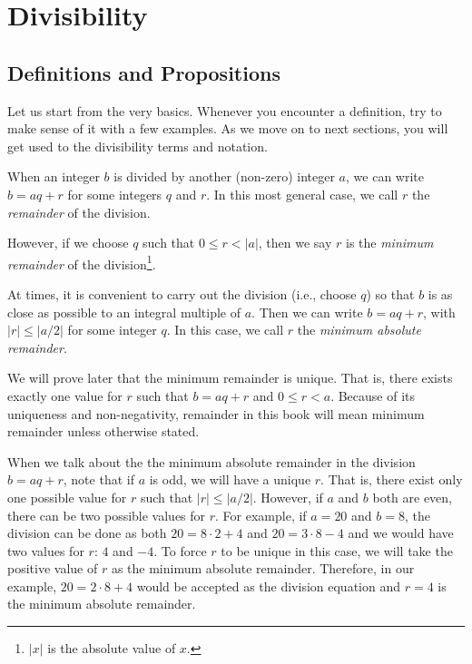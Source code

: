 \chapter{Divisibility}\label{ch:divisibility}

\section{Definitions and Propositions}
Let us start from the very basics. Whenever you encounter a definition, try to make sense of it with a few examples. As we move on to next sections, you will get used to the divisibility terms and notation.
\begin{definition}\label{def:remainder}
	When an integer $b$ is divided by another (non-zero) integer $a$, we can write $b=aq+r$ for some integers $q$ and $r$. In this most general case, we call $r$ the \textit{remainder} of the division.

	However, if we choose $q$ such that $0\leq r< |a|$, then we say $r$ is the \textit{minimum remainder} of the division\footnote{$|x|$ is the absolute value of $x$.}.

	At times, it is convenient to carry out the division (i.e., choose $q$) so that $b$ is as close as possible to an integral multiple of $a$. Then we can write $b = aq + r$, with $|r| \leq |a/2|$ for some integer $q$.  In this case, we call $r$ the \textit{minimum absolute remainder}.
\end{definition}

\begin{note}[1]
	We will prove later that the minimum remainder is unique. That is, there exists exactly one value for $r$ such that $b=aq+r$ and $0 \leq r <a$. Because of its uniqueness and non-negativity, remainder in this book will mean minimum remainder unless otherwise stated.
\end{note}

\begin{note}[2]
	When we talk about the the minimum absolute remainder in the division $b=aq+r$, note that if $a$ is odd, we will have a unique $r$. That is, there exist only one possible value for $r$ such that $|r| \leq \left|a/2\right|$. However, if $a$ and $b$ both are even, there can be two possible values for $r$. For example, if $a=20$ and $b=8$, the division can be done as both $20=8\cdot2+4$ and $20=3\cdot8-4$ and we would have two values for $r$: $4$ and $-4$. To force $r$ to be unique in this case, we will take the positive value of $r$ as the minimum absolute remainder. Therefore, in our example, $20=2\cdot8+4$ would be accepted as the division equation and $r=4$ is the minimum absolute remainder.
\end{note}

